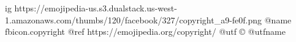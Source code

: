  
 
 
 
 

\ifcmt
	ig https://emojipedia-us.s3.dualstack.us-west-1.amazonaws.com/thumbs/120/facebook/327/copyright_a9-fe0f.png
	@name fbicon.copyright
	@ref https://emojipedia.org/copyright/
	@utf ©️ 
	@utfname
\fi
